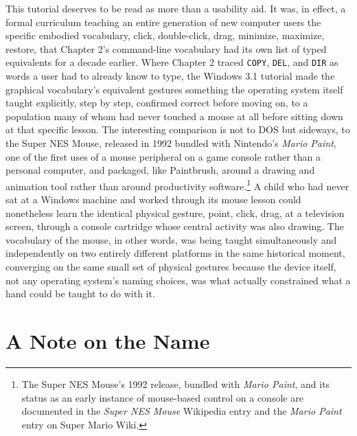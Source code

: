 \documentclass[11pt]{book}
\begin{document}
This tutorial deserves to be read as more than a usability aid. It was, in effect, a formal curriculum teaching an entire generation of new computer users the specific embodied vocabulary, click, double-click, drag, minimize, maximize, restore, that Chapter 2's command-line vocabulary had its own list of typed equivalents for a decade earlier. Where Chapter 2 traced \texttt{COPY}, \texttt{DEL}, and \texttt{DIR} as words a user had to already know to type, the Windows 3.1 tutorial made the graphical vocabulary's equivalent gestures something the operating system itself taught explicitly, step by step, confirmed correct before moving on, to a population many of whom had never touched a mouse at all before sitting down at that specific lesson. The interesting comparison is not to DOS but sideways, to the Super NES Mouse, released in 1992 bundled with Nintendo's \emph{Mario Paint}, one of the first uses of a mouse peripheral on a game console rather than a personal computer, and packaged, like Paintbrush, around a drawing and animation tool rather than around productivity software.\footnote{The Super NES Mouse's 1992 release, bundled with \emph{Mario Paint}, and its status as an early instance of mouse-based control on a console are documented in the \emph{Super NES Mouse} Wikipedia entry and the \emph{Mario Paint} entry on Super Mario Wiki.} A child who had never sat at a Windows machine and worked through its mouse lesson could nonetheless learn the identical physical gesture, point, click, drag, at a television screen, through a console cartridge whose central activity was also drawing. The vocabulary of the mouse, in other words, was being taught simultaneously and independently on two entirely different platforms in the same historical moment, converging on the same small set of physical gestures because the device itself, not any operating system's naming choices, was what actually constrained what a hand could be taught to do with it.

\section{A Note on the Name}
\end{document}
